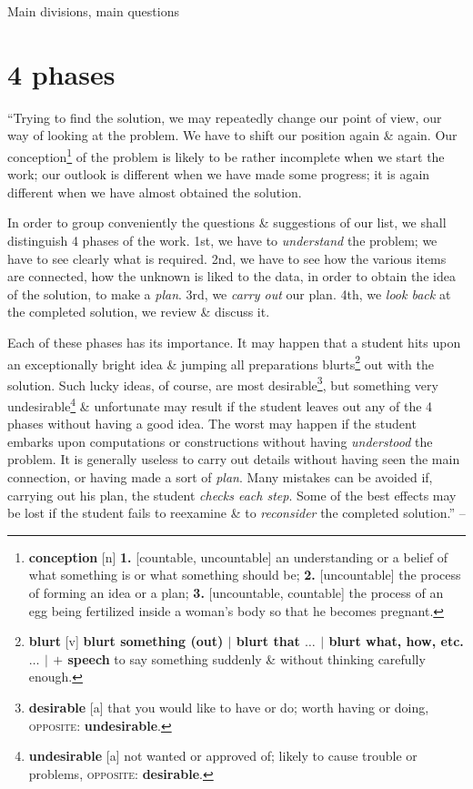 \documentclass[oneside]{book}
\numberwithin{equation}{section}
\begin{document}
\begin{center}
	\LARGE Main divisions, main questions
\end{center}

\section{4 phases}
``Trying to find the solution, we may repeatedly change our point of view, our way of looking at the problem. We have to shift our position again \& again. Our conception\footnote{\textbf{conception} [n] \textbf{1.} [countable, uncountable] an understanding or a belief of what something is or what something should be; \textbf{2.} [uncountable] the process of forming an idea or a plan; \textbf{3.} [uncountable, countable] the process of an egg being fertilized inside a woman's body so that he becomes pregnant.} of the problem is likely to be rather incomplete when we start the work; our outlook is different when we have made some progress; it is again different when we have almost obtained the solution.

In order to group conveniently the questions \& suggestions of our list, we shall distinguish 4 phases of the work. 1st, we have to \textit{understand} the problem; we have to see clearly what is required. 2nd, we have to see how the various items are connected, how the unknown is liked to the data, in order to obtain the idea of the solution, to make a \textit{plan}. 3rd, we \textit{carry out} our plan. 4th, we \textit{look back} at the completed solution, we review \& discuss it.

Each of these phases has its importance. It may happen that a student hits upon an exceptionally bright idea \& jumping all preparations blurts\footnote{\textbf{blurt} [v] \textbf{blurt something (out) $|$ blurt that $\ldots$ $|$ blurt what, how, etc. $\ldots$ $|$ $+$ speech} to say something suddenly \& without thinking carefully enough.} out with the solution. Such lucky ideas, of course, are most desirable\footnote{\textbf{desirable} [a] that you would like to have or do; worth having or doing, \textsc{opposite}: \textbf{undesirable}.}, but something very undesirable\footnote{\textbf{undesirable} [a] not wanted or approved of; likely to cause trouble or problems, \textsc{opposite}: \textbf{desirable}.} \& unfortunate may result if the student leaves out any of the 4 phases without having a good idea. The worst may happen if the student embarks upon computations or constructions without having \textit{understood} the problem. It is generally useless to carry out details without having seen the main connection, or having made a sort of \textit{plan}. Many mistakes can be avoided if, carrying out his plan, the student \textit{checks each step}. Some of the best effects may be lost if the student fails to reexamine \& to \textit{reconsider} the completed solution.'' -- \cite[pp. 5--6]{Polya2014}
\end{document}
